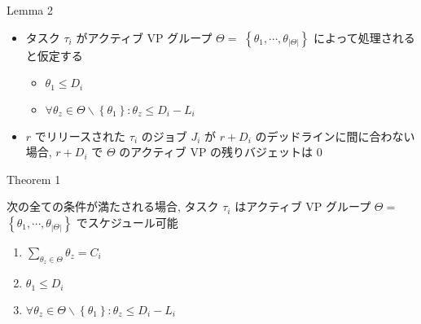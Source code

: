 {    \begin{frame}[label=lemma2]{Lemma 2}
        \begin{lemma}[]
            \begin{itemize}
                \item タスク $\tau_{i}$ がアクティブ VP グループ $\Theta=$  $\left\{\theta_{1}, \cdots, \theta_{|\Theta|}\right\}$ によって処理されると仮定する
                      \begin{itemize}
                          \item $\theta_{1} \leq D_{i}$
                          \item $\forall \theta_{z} \in \Theta \backslash\left\{\theta_{1}\right\}: \theta_{z} \leq D_{i}-L_{i}$
                      \end{itemize}
                \item $r$ でリリースされた $\tau_{i}$ のジョブ $J_{i}$ が $r+D_{i}$ のデッドラインに間に合わない場合, $r+D_{i}$ で $\Theta$ のアクティブ VP の残りバジェットは 0
            \end{itemize}
        \end{lemma}
    \end{frame}
}

\begin{frame}[label=theorem1]{Theorem 1}
    \begin{theorem}[]
        次の全ての条件が満たされる場合, タスク $\tau_{i}$ はアクティブ VP グループ $\Theta=$  $\left\{\theta_{1}, \cdots, \theta_{|\Theta|}\right\}$ でスケジュール可能
        \begin{enumerate}
            \item $\sum_{\theta_{z} \in \Theta} \theta_{z}=C_{i}$
            \item $\theta_{1} \leq D_{i}$
            \item $\forall \theta_{z} \in \Theta \backslash\left\{\theta_{1}\right\}: \theta_{z} \leq D_{i}-L_{i}$
        \end{enumerate}
    \end{theorem}
\end{frame}
